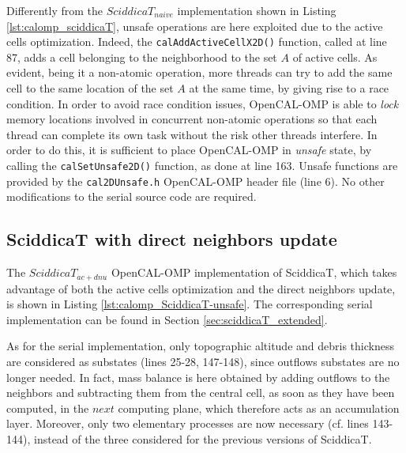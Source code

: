 

Differently from the $SciddicaT_{naive}$ implementation shown in
Listing \ref{lst:calomp_sciddicaT}, unsafe operations are here
exploited due to the active cells optimization. Indeed, the
\verb'calAddActiveCellX2D()' function, called at line 87, adds a cell
belonging to the neighborhood to the set $A$ of active cells. As
evident, being it a non-atomic operation, more threads can try to add
the same cell to the same location of the set $A$ at the same time, by
giving rise to a race condition. In order to avoid race condition
issues, OpenCAL-OMP is able to \emph{lock} memory locations involved
in concurrent non-atomic operations so that each thread can complete
its own task without the risk other threads interfere. In order to do
this, it is sufficient to place OpenCAL-OMP in \emph{unsafe} state, by
calling the \verb'calSetUnsafe2D()' function, as done at line
163. Unsafe functions are provided by the \verb'cal2DUnsafe.h'
OpenCAL-OMP header file (line 6). No other modifications to the serial
source code are required.

\subsection{SciddicaT with direct neighbors update}
The $SciddicaT_{ac+dnu}$ OpenCAL-OMP implementation of SciddicaT,
which takes advantage of both the active cells optimization and the
direct neighbors update, is shown in Listing
\ref{lst:calomp_SciddicaT-unsafe}. The corresponding serial
implementation can be found in Section \ref{sec:sciddicaT_extended}.



As for the serial implementation, only topographic altitude and debris
thickness are considered as substates (lines 25-28, 147-148), since
outflows substates are no longer needed. In fact, mass balance is here
obtained by adding outflows to the neighbors and subtracting them from
the central cell, as soon as they have been computed, in the $next$
computing plane, which therefore acts as an accumulation
layer. Moreover, only two elementary processes are now necessary
(cf. lines 143-144), instead of the three considered for the previous
versions of SciddicaT.

